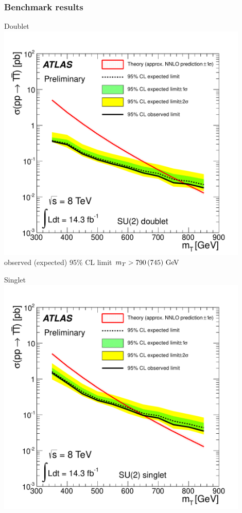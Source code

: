 \begin{frame}\frametitle{Benchmark results}
\centering\footnotesize

\begin{minipage}{.5\textwidth}\centering

Doublet\\

\includegraphics[width=0.9\textwidth]{pics/lim_doublet}\\

observed (expected) 95\%  CL limit $m_{T}>790\,(745)\gev$

\end{minipage}\begin{minipage}{.5\textwidth}\centering

Singlet\\

\includegraphics[width=0.9\textwidth]{pics/lim_singlet}\\


\end{minipage}
\end{frame}
